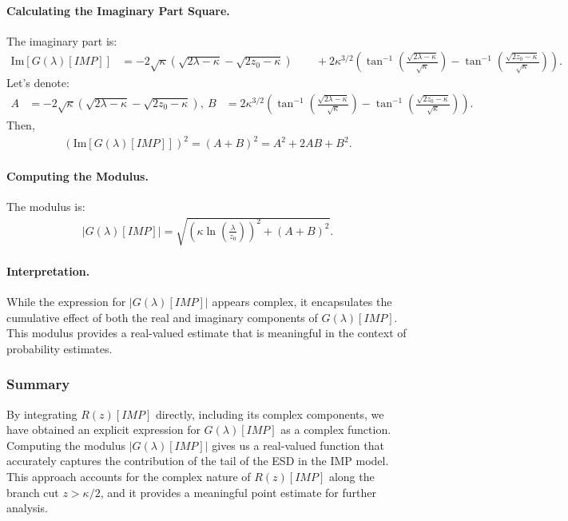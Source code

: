 \paragraph{Calculating the Imaginary Part Square.}

The imaginary part is:
\begin{align}
\text{Im}[ G(\lambda)[IMP] ] &= - 2 \sqrt{ \kappa } \left( \sqrt{ 2 \lambda - \kappa } - \sqrt{ 2 z_0 - \kappa } \right ) \
&\quad + 2 \kappa^{ 3/2 } \left( \tan^{-1} \left( \frac{ \sqrt{ 2 \lambda - \kappa } }{ \sqrt{ \kappa } } \right ) - \tan^{-1} \left( \frac{ \sqrt{ 2 z_0 - \kappa } }{ \sqrt{ \kappa } } \right ) \right ).
\end{align}
%
Let’s denote:
\begin{align}
A &= - 2 \sqrt{ \kappa } \left( \sqrt{ 2 \lambda - \kappa } - \sqrt{ 2 z_0 - \kappa } \right ), \
B &= 2 \kappa^{ 3/2 } \left( \tan^{-1} \left( \frac{ \sqrt{ 2 \lambda - \kappa } }{ \sqrt{ \kappa } } \right ) - \tan^{-1} \left( \frac{ \sqrt{ 2 z_0 - \kappa } }{ \sqrt{ \kappa } } \right ) \right ).
\end{align}
%
Then,
\begin{align}
\left( \text{Im}[ G(\lambda)[IMP] ] \right )^2 = (A + B)^2 = A^2 + 2AB + B^2.
\end{align}


\paragraph{Computing the Modulus.}

The modulus is:
\begin{align}
| G(\lambda)[IMP] | = \sqrt{ \left( \kappa \ln \left( \frac{ \lambda }{ z_0 } \right ) \right )^2 + \left( A + B \right )^2 }.
\end{align}


\paragraph{Interpretation.}

While the expression for $| G(\lambda)[IMP] |$ appears complex, it encapsulates the cumulative effect of both the real and imaginary components of $G(\lambda)[IMP]$. This modulus provides a real-valued estimate that is meaningful in the context of probability estimates.


\subsubsection{Summary}

By integrating $R(z)[IMP]$ directly, including its complex components, we have obtained an explicit expression for $G(\lambda)[IMP]$ as a complex function. 
Computing the modulus $| G(\lambda)[IMP] |$ gives us a real-valued function that accurately captures the contribution of the tail of the ESD in the IMP model.
%
This approach accounts for the complex nature of $R(z)[IMP]$ along the branch cut $z > \kappa/2$, and it provides a meaningful point estimate for further analysis.


